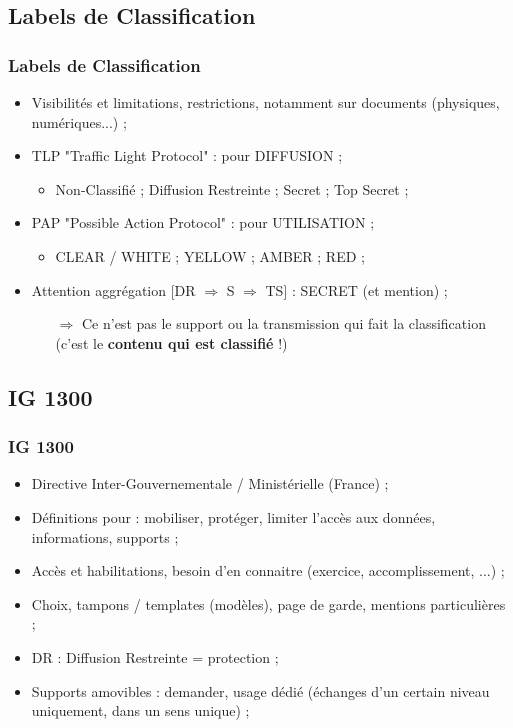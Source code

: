 \documentclass[slidetop,11pt]{beamer}
\begin{document}
\subsection{Labels de Classification}
\begin{frame}
	\frametitle{Labels de Classification}
	\begin{itemize}
		\item Visibilit{\'e}s et limitations, restrictions, notamment sur documents (physiques, num{\'e}riques...) ; 
		\item TLP "Traffic Light Protocol" : pour DIFFUSION ; 
		\begin{itemize}
			\item Non-Classifi{\'e} ; Diffusion Restreinte ; Secret ; Top Secret ; 
		\end{itemize}
		\item PAP "Possible Action Protocol" : pour UTILISATION ; 
		\begin{itemize}
			\item CLEAR / WHITE ; YELLOW ; AMBER ; RED ; 
		\end{itemize}
		\item Attention aggr{\'e}gation [DR $\Rightarrow$ S $\Rightarrow$ TS] : SECRET (et mention) ; 
		\begin{itemize}
			\item[$\Longrightarrow$] Ce n'est pas le support ou la transmission qui fait la classification 
			(c'est le \textbf{contenu qui est classifi{\'e}} !)
		\end{itemize}
	\end{itemize}
\end{frame}

\subsection{IG 1300}
\begin{frame}
	\frametitle{IG 1300}
	\begin{itemize}
		\item Directive Inter-Gouvernementale / Minist{\'e}rielle (France) ; 
		\item D{\'e}finitions pour : mobiliser, prot{\'e}ger, limiter l'acc{\`e}s aux donn{\'e}es, informations, supports ; 
		\item Acc{\`e}s et habilitations, besoin d'en connaitre (exercice, accomplissement, ...) ; 
		\item Choix, tampons / templates (mod{\`e}les), page de garde, mentions particuli{\`e}res ; 
		\item DR : Diffusion Restreinte = protection ; 
		\item Supports amovibles : demander, usage d{\'e}di{\'e} ({\'e}changes d'un certain niveau uniquement, dans un sens unique) ; 
	\end{itemize}
\end{frame}
\end{document}
